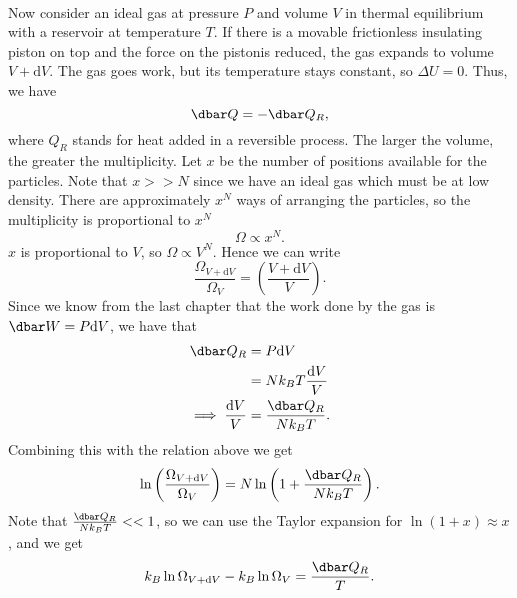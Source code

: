 \documentclass[../thermodynamics.tex]{subfiles}
\begin{document}
        \paragraph{}
        Now consider an ideal gas at pressure $P$ and volume $V$ in thermal equilibrium with a reservoir at temperature $T$.
        If there is a movable frictionless insulating piston on top and the force on the pistonis reduced, the gas expands to volume $V+\mathrm{d}V$.
        The gas goes work, but its temperature stays constant, so $\Delta U=0$.
        Thus, we have
        \begin{equation}
            \dbar Q=-\dbar Q_R,
        \end{equation}
        where $Q_R$ stands for heat added in a reversible process.
        The larger the volume, the greater the multiplicity.
        Let $x$ be the number of positions available for the particles.
        Note that $x>>N$ since we have an ideal gas which must be at low density.
        There are approximately $x^N$ ways of arranging the particles, so the multiplicity is proportional to $x^N$
        \begin{equation}
            \Omega\propto x^N.
        \end{equation}
        $x$ is proportional to $V$, so $\Omega\propto V^N$.
        Hence we can write
        \begin{equation}
            \frac{\Omega_{V+\mathrm{d}V}}{\Omega_V}=\left(\frac{V+\mathrm{d}V}{V}\right).
        \end{equation}
        Since we know from the last chapter that the work done by the gas is $\dbar W=P\mathrm{d}V$, we have that
        \begin{align}
            \dbar Q_R&=P\mathrm{d}V\\
            &=Nk_BT\frac{\mathrm{d}V}{V}\\
            \implies\frac{\mathrm{d}{V}}{V}&=\frac{\dbar Q_R}{Nk_BT}.
        \end{align}
        Combining this with the relation above we get
        \begin{equation}
            \ln\left(\frac{\Omega_{V+\mathrm{d}V}}{\Omega_V}\right)=N\ln\left(1+\frac{\dbar Q_R}{Nk_BT}\right).
        \end{equation}
        Note that $\frac{\dbar Q_R}{Nk_BT}<<1$, so we can use the Taylor expansion for $\ln(1+x)\approx x$, and we get
        \begin{equation}
            k_B\ln\Omega_{V+\mathrm{d}V}-k_B\ln\Omega_V=\frac{\dbar Q_R}{T}.
        \end{equation}
\end{document}
